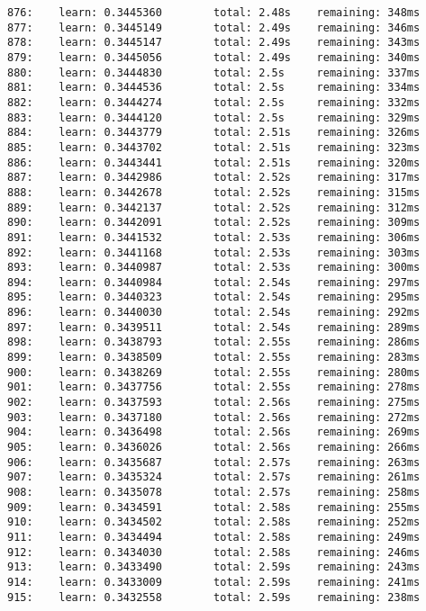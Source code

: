 \documentclass[11pt]{article}
\begin{document}
\begin{Verbatim}[commandchars=\\\{\}]
876:    learn: 0.3445360        total: 2.48s    remaining: 348ms
877:    learn: 0.3445149        total: 2.49s    remaining: 346ms
878:    learn: 0.3445147        total: 2.49s    remaining: 343ms
879:    learn: 0.3445056        total: 2.49s    remaining: 340ms
880:    learn: 0.3444830        total: 2.5s     remaining: 337ms
881:    learn: 0.3444536        total: 2.5s     remaining: 334ms
882:    learn: 0.3444274        total: 2.5s     remaining: 332ms
883:    learn: 0.3444120        total: 2.5s     remaining: 329ms
884:    learn: 0.3443779        total: 2.51s    remaining: 326ms
885:    learn: 0.3443702        total: 2.51s    remaining: 323ms
886:    learn: 0.3443441        total: 2.51s    remaining: 320ms
887:    learn: 0.3442986        total: 2.52s    remaining: 317ms
888:    learn: 0.3442678        total: 2.52s    remaining: 315ms
889:    learn: 0.3442137        total: 2.52s    remaining: 312ms
890:    learn: 0.3442091        total: 2.52s    remaining: 309ms
891:    learn: 0.3441532        total: 2.53s    remaining: 306ms
892:    learn: 0.3441168        total: 2.53s    remaining: 303ms
893:    learn: 0.3440987        total: 2.53s    remaining: 300ms
894:    learn: 0.3440984        total: 2.54s    remaining: 297ms
895:    learn: 0.3440323        total: 2.54s    remaining: 295ms
896:    learn: 0.3440030        total: 2.54s    remaining: 292ms
897:    learn: 0.3439511        total: 2.54s    remaining: 289ms
898:    learn: 0.3438793        total: 2.55s    remaining: 286ms
899:    learn: 0.3438509        total: 2.55s    remaining: 283ms
900:    learn: 0.3438269        total: 2.55s    remaining: 280ms
901:    learn: 0.3437756        total: 2.55s    remaining: 278ms
902:    learn: 0.3437593        total: 2.56s    remaining: 275ms
903:    learn: 0.3437180        total: 2.56s    remaining: 272ms
904:    learn: 0.3436498        total: 2.56s    remaining: 269ms
905:    learn: 0.3436026        total: 2.56s    remaining: 266ms
906:    learn: 0.3435687        total: 2.57s    remaining: 263ms
907:    learn: 0.3435324        total: 2.57s    remaining: 261ms
908:    learn: 0.3435078        total: 2.57s    remaining: 258ms
909:    learn: 0.3434591        total: 2.58s    remaining: 255ms
910:    learn: 0.3434502        total: 2.58s    remaining: 252ms
911:    learn: 0.3434494        total: 2.58s    remaining: 249ms
912:    learn: 0.3434030        total: 2.58s    remaining: 246ms
913:    learn: 0.3433490        total: 2.59s    remaining: 243ms
914:    learn: 0.3433009        total: 2.59s    remaining: 241ms
915:    learn: 0.3432558        total: 2.59s    remaining: 238ms

\end{Verbatim}
\end{document}
